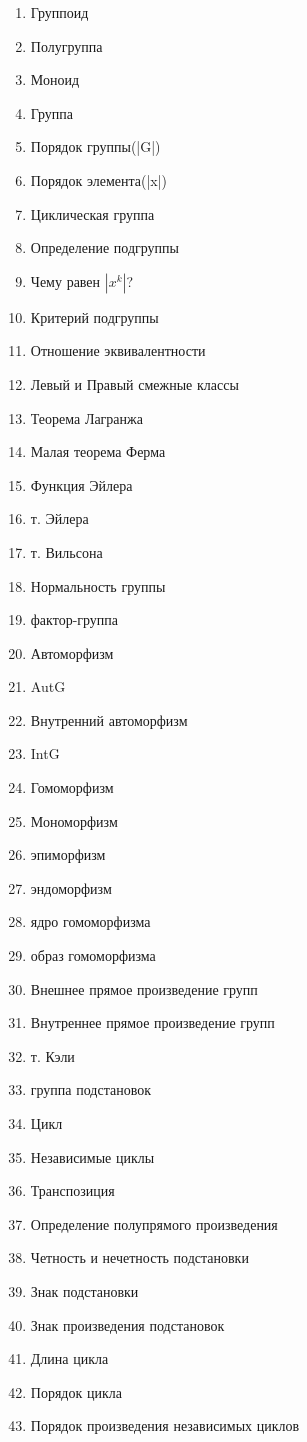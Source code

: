 \documentclass[12pt]{article}
\begin{document}
						
		\begin{enumerate}
				\item Группоид
				\item Полугруппа
				\item Моноид
				\item Группа
				\item Порядок группы(|G|)
				\item Порядок элемента(|x|)
				\item Циклическая группа
				\item Определение подгруппы
				\item Чему равен $|x^k|$? 
				\item Критерий подгруппы
				\item Отношение эквивалентности
				\item Левый и Правый смежные классы 
				\item Теорема Лагранжа
				\item Малая теорема Ферма
				\item Функция Эйлера
				\item т. Эйлера 
				\item т. Вильсона
				\item Нормальность группы 
				\item фактор-группа
				\item Автоморфизм
				\item AutG 
				\item Внутренний автоморфизм
				\item IntG
				\item Гомоморфизм
				\item Мономорфизм
				\item эпиморфизм
				\item эндоморфизм 
				\item ядро гомоморфизма 
				\item образ гомоморфизма
				\item Внешнее прямое произведение групп
				\item Внутреннее прямое произведение групп
				\item т. Кэли				
				\item группа подстановок
				\item Цикл 
				\item Независимые циклы
				\item Транспозиция
				\item Определение полупрямого произведения
				\item Четность и нечетность подстановки
				\item Знак подстановки
				\item Знак произведения подстановок 
				\item Длина цикла
				\item Порядок цикла
				\item Порядок произведения независимых циклов
			\end{enumerate}
	
\end{document}

